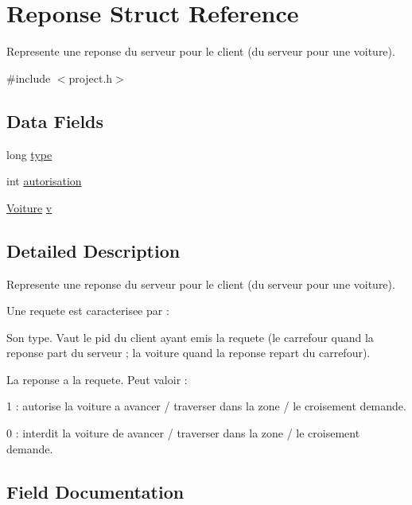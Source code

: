 \hypertarget{struct_reponse}{}\section{Reponse Struct Reference}
\label{struct_reponse}


Represente une reponse du serveur pour le client (du serveur pour une voiture).  




{\ttfamily \#include $<$project.\+h$>$}

\subsection*{Data Fields}
\begin{DoxyCompactItemize}
\item 
long \hyperlink{struct_reponse_a6a83a8677f7c78fd146859325e08209a}{type}
\item 
int \hyperlink{struct_reponse_a9ae59baa7d0f7ac15cc2090faf0b5b43}{autorisation}
\item 
\hyperlink{struct_voiture}{Voiture} \hyperlink{struct_reponse_a76a64000aab59dcc4195c1b6e1605eb3}{v}
\end{DoxyCompactItemize}


\subsection{Detailed Description}
Represente une reponse du serveur pour le client (du serveur pour une voiture). 

Une requete est caracterisee par \+:
\begin{DoxyItemize}
\item Son type. Vaut le pid du client ayant emis la requete (le carrefour quand la reponse part du serveur ; la voiture quand la reponse repart du carrefour).
\item La reponse a la requete. Peut valoir \+:
\begin{DoxyItemize}
\item 1 \+: autorise la voiture a avancer / traverser dans la zone / le croisement demande.
\item 0 \+: interdit la voiture de avancer / traverser dans la zone / le croisement demande. 
\end{DoxyItemize}
\end{DoxyItemize}

\subsection{Field Documentation}
\hypertarget{struct_reponse_a9ae59baa7d0f7ac15cc2090faf0b5b43}{}
